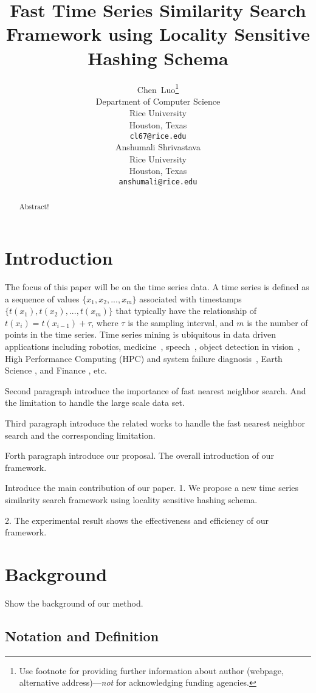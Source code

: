 \documentclass{article}
\title{Fast Time Series Similarity Search Framework using Locality Sensitive Hashing Schema}
\author{
  Chen~Luo\thanks{Use footnote for providing further
    information about author (webpage, alternative
    address)---\emph{not} for acknowledging funding agencies.} \\
  Department of Computer Science\\
  Rice University\\
  Houston, Texas \\
  \texttt{cl67@rice.edu} \\
  \And
  Anshumali Shrivastava \\
  Rice University \\
  Houston, Texas \\
  \texttt{anshumali@rice.edu} \\
}
\begin{document}

\maketitle

\begin{abstract}
  Abstract!
\end{abstract}

\section{Introduction}

The focus of this paper will be on the time series data. A time series is defined as a sequence of values $\{x_1,x_2,...,x_m\}$
associated with timestamps $\{t(x_1), t(x_2),..., t(x_m)\}$ that typically have the relationship of $t(x_i) = t(x_{i-1})+\tau$, where $\tau$ is  the sampling interval, and $m$ is the number of points in the time series. Time series mining is ubiquitous in data driven applications including robotics, medicine~\cite{oates2000method,caracca2000discovering}, speech~\cite{rabiner1993fundamentals}, object detection in vision~\cite{yang2002detecting, sonka2014image}, High Performance Computing (HPC) and system failure diagnosis~\cite{luo2014correlating,sun2014querying}, Earth Science \cite{mudelsee2013climate}, and Finance \cite{granger2014forecasting}, etc.

Second paragraph introduce the importance of fast nearest neighbor search. And the limitation to handle the large scale data set.

Third paragraph introduce the related works to handle the fast nearest neighbor search and the corresponding limitation. 

Forth paragraph introduce our proposal. The overall introduction of our framework. 

Introduce the main contribution of our paper.
1. We propose a new time series similarity search framework using locality sensitive hashing schema.

2. The experimental result shows the effectiveness and efficiency of our framework.

\section{Background}
Show the background of our method.

\subsection{Notation and Definition}
\end{document}
